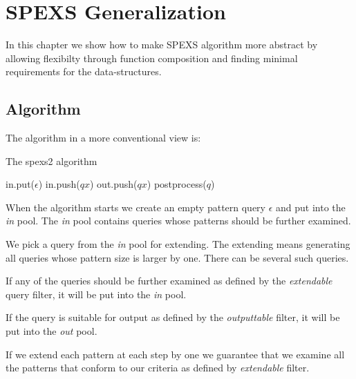 \chapter{SPEXS Generalization}

\WIP

In this chapter we show how to make SPEXS algorithm more abstract by allowing flexibilty through function composition and finding minimal requirements for the data-structures.

\section{Algorithm}

The algorithm in a more conventional view is:

\begin{algorithm}[H]
	\caption{The spexs2 algorithm}
\begin{algorithmic}[1]
	\Statex
		\State in.put($\epsilon$)
					\State in.push($qx$)
				\EndIf
					\State out.push($qx$)
				\EndIf
			\EndFor
			\State postprocess($q$)
		\EndWhile
	\EndFunction
\end{algorithmic}
\end{algorithm}

When the algorithm starts we create an empty pattern query $\epsilon$ and put into the \emph{in} pool. The \emph{in} pool contains queries whose patterns should be further examined.

We pick a query from the \emph{in} pool for extending. The extending means generating all queries whose pattern size is larger by one. There can be several such queries.

If any of the queries should be further examined as defined by the \emph{extendable} query filter, it will be put into the \emph{in} pool.

If the query is suitable for output as defined by the \emph{outputtable} filter, it will be put into the \emph{out} pool. 

If we extend each pattern at each step by one we guarantee that we examine all the patterns that conform to our criteria as defined by \emph{extendable} filter.

